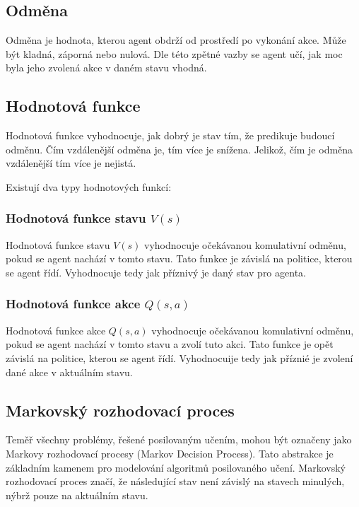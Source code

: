   \subsection{Odměna}

  Odměna je hodnota, kterou agent obdrží od prostředí po vykonání akce.
  Může být kladná, záporná nebo nulová.
  Dle této zpětné vazby se agent učí, jak moc byla jeho zvolená akce v daném stavu vhodná.

\subsection{Hodnotová funkce}

  Hodnotová funkce vyhodnocuje, jak dobrý je stav tím, že predikuje budoucí odměnu.
  Čím vzdálenější odměna je, tím více je snížena.
  Jelikož, čím je odměna vzdálenější tím více je nejistá.

  Existují dva typy hodnotových funkcí:

  \subsubsection*{Hodnotová funkce stavu $V(s)$}

  Hodnotová funkce stavu \emph{$V(s)$} vyhodnocuje očekávanou komulativní odměnu, pokud se agent nachází v tomto stavu.
  Tato funkce je závislá na politice, kterou se agent řídí.
  Vyhodnocuje tedy jak příznivý je daný stav pro agenta.

  \subsubsection*{Hodnotová funkce akce $Q(s, a)$}
  \label{sec:Q_function}

  Hodnotová funkce akce \emph{$Q(s, a)$} vyhodnocuje očekávanou komulativní odměnu, pokud se agent nachází v tomto stavu a zvolí tuto akci.
  Tato funkce je opět závislá na politice, kterou se agent řídí.
  Vyhodnocuije tedy jak příznié je zvolení dané akce v aktuálním stavu.


\subsection{Markovský rozhodovací proces}

Teměř všechny problémy, řešené posilovaným učením, mohou být označeny jako Markovy rozhodovací procesy (Markov Decision Process).
Tato abstrakce je základním kamenem pro modelování algoritmů posilovaného učení.
Markovský rozhodovací proces značí, že následující stav není závislý na stavech minulých, nýbrž pouze na aktuálním stavu.

